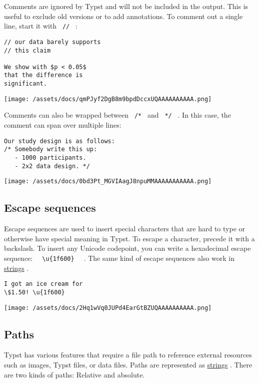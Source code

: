 Comments are ignored by Typst and will not be included in the output.
This is useful to exclude old versions or to add annotations. To comment
out a single line, start it with \texttt{\ //\ } :

\begin{verbatim}
// our data barely supports
// this claim

We show with $p < 0.05$
that the difference is
significant.
\end{verbatim}

\texttt{[image: /assets/docs/qmPJyf2DgB8m9bpdDccxUQAAAAAAAAAA.png]}

Comments can also be wrapped between \texttt{\ /*\ } and \texttt{\ */\ }
. In this case, the comment can span over multiple lines:

\begin{verbatim}
Our study design is as follows:
/* Somebody write this up:
   - 1000 participants.
   - 2x2 data design. */
\end{verbatim}

\texttt{[image: /assets/docs/0bd3Pt\_MGVIAagJ8npuMMAAAAAAAAAAA.png]}

\subsection{Escape sequences}\label{escapes}

Escape sequences are used to insert special characters that are hard to
type or otherwise have special meaning in Typst. To escape a character,
precede it with a backslash. To insert any Unicode codepoint, you can
write a hexadecimal escape sequence:
\texttt{\ }{\texttt{\ \textbackslash{}u\{1f600\}\ }}\texttt{\ } . The
same kind of escape sequences also work in
\href{/docs/reference/foundations/str/}{strings} .

\begin{verbatim}
I got an ice cream for
\$1.50! \u{1f600}
\end{verbatim}

\texttt{[image: /assets/docs/2Hq1wVq0JUPd4EarGtBZUQAAAAAAAAAA.png]}

\subsection{Paths}\label{paths}

Typst has various features that require a file path to reference
external resources such as images, Typst files, or data files. Paths are
represented as \href{/docs/reference/foundations/str/}{strings} . There
are two kinds of paths: Relative and absolute.

